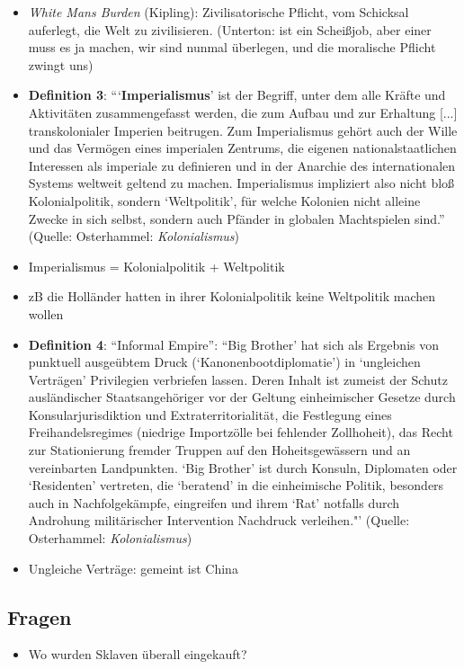 \documentclass[emulatestandardclasses]{scrartcl}
\begin{document}
\begin{itemize}
  \item \emph{White Mans Burden} (Kipling): Zivilisatorische Pflicht, vom Schicksal auferlegt, die Welt zu zivilisieren. (Unterton: ist ein Scheißjob, aber einer muss es ja machen, wir sind nunmal überlegen, und die moralische Pflicht zwingt uns)
  \item \textbf{Definition 3}: "``\textbf{Imperialismus}' ist der Begriff, unter dem alle Kräfte und Aktivitäten zusammengefasst werden, die zum Aufbau und zur Erhaltung [...] transkolonialer Imperien beitrugen. Zum Imperialismus gehört auch der Wille und das Vermögen eines imperialen Zentrums, die eigenen nationalstaatlichen Interessen als imperiale zu definieren und in der Anarchie des internationalen Systems weltweit geltend zu machen. Imperialismus impliziert also nicht bloß Kolonialpolitik, sondern `Weltpolitik', für welche Kolonien nicht alleine Zwecke in sich selbst, sondern auch Pfänder in globalen Machtspielen sind."' (Quelle: Osterhammel: \emph{Kolonialismus}) 
  \item Imperialismus = Kolonialpolitik + Weltpolitik
  \item zB die Holländer hatten in ihrer Kolonialpolitik keine Weltpolitik machen wollen
  \item \textbf{Definition 4}: "`Informal Empire"': ``Big Brother' hat sich als Ergebnis von punktuell ausgeübtem Druck (`Kanonenbootdiplomatie') in `ungleichen Verträgen' Privilegien verbriefen lassen. Deren Inhalt ist zumeist der Schutz ausländischer Staatsangehöriger vor der Geltung einheimischer Gesetze durch Konsularjurisdiktion und Extraterritorialität, die Festlegung eines Freihandelsregimes (niedrige Importzölle bei fehlender Zollhoheit), das Recht zur Stationierung fremder Truppen auf den Hoheitsgewässern und an vereinbarten Landpunkten. `Big Brother' ist durch Konsuln, Diplomaten oder `Residenten' vertreten, die `beratend' in die einheimische Politik, besonders auch in Nachfolgekämpfe, eingreifen und ihrem `Rat' notfalls durch Androhung militärischer Intervention Nachdruck verleihen."' (Quelle: Osterhammel: \emph{Kolonialismus})
  \item Ungleiche Verträge: gemeint ist China 
\end{itemize}

\subsection{Fragen}

\begin{itemize}
  \item Wo wurden Sklaven überall eingekauft?
\end{itemize}
\end{document}
